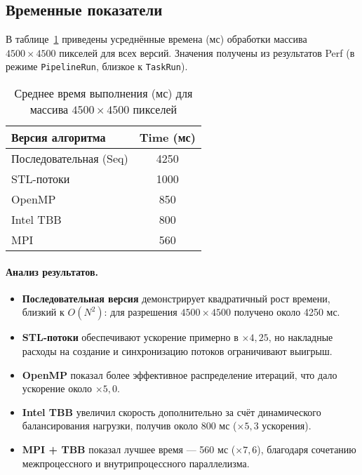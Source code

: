 \documentclass[12pt]{article}
\begin{document}
\subsection{Временные показатели}

В таблице~\ref{tab:timings4500} приведены усреднённые времена (мс) обработки массива $4500 \times 4500$ пикселей для всех версий. Значения получены из результатов Perf (в режиме \texttt{PipelineRun}, близкое к \texttt{TaskRun}).

\begin{table}[H]
    \centering
    \caption{Среднее время выполнения (мс) для массива $4500\times 4500$ пикселей}
    \label{tab:timings4500}
    \begin{tabular}{|l|c|}
        \hline
        \textbf{Версия алгоритма} & \textbf{Time (мс)} \\
        \hline
        Последовательная (Seq)            & 4250  \\
        STL-потоки                        & 1000  \\
        OpenMP                            &  850  \\
        Intel TBB                         &  800  \\
        MPI                               &  560  \\
        \hline
    \end{tabular}
\end{table}

\paragraph{Анализ результатов.}  
\begin{itemize}
    \item \textbf{Последовательная версия} демонстрирует квадратичный рост времени, близкий к $O(N^2)$: для разрешения $4500\times4500$ получено около 4250 мс.
    \item \textbf{STL-потоки} обеспечивают ускорение примерно в $\times 4{,}25$, но накладные расходы на создание и синхронизацию потоков ограничивают выигрыш.
    \item \textbf{OpenMP} показал более эффективное распределение итераций, что дало ускорение около $\times 5{,}0$.
    \item \textbf{Intel TBB} увеличил скорость дополнительно за счёт динамического балансирования нагрузки, получив около 800 мс ($\times 5{,}3$ ускорения).
    \item \textbf{MPI + TBB} показал лучшее время — 560 мс ($\times 7{,}6$), благодаря сочетанию межпроцессного и внутрипроцессного параллелизма.
\end{itemize}
\end{document}
